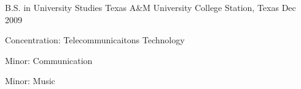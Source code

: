

\begin{cventries}

  \cventry
    {B.S. in University Studies} %
    {Texas A\&M University} %
    {College Station, Texas} %
    {Dec 2009} %
    {
      \begin{cvitems}
          \item {Concentration: Telecommunicaitons Technology} %
          \item {Minor: Communication} %
          \item {Minor: Music} %
      \end{cvitems}
    }

\end{cventries}
